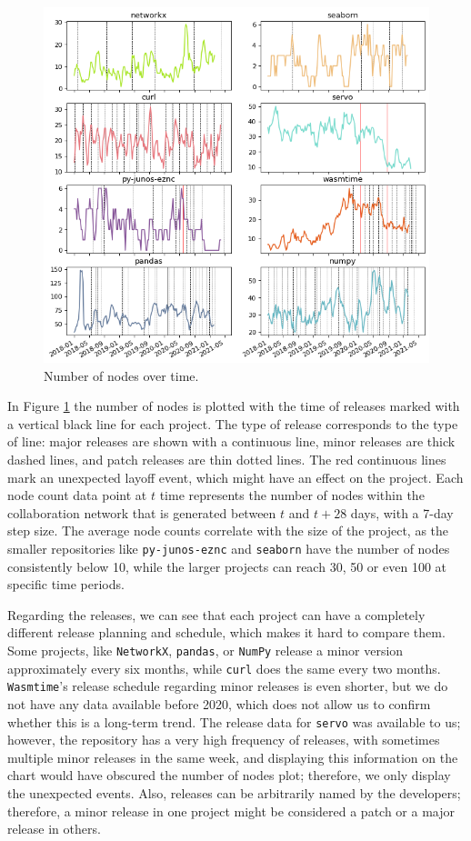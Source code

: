 \begin{figure}
    \centering
    \includegraphics[width=\textwidth]{figures/qualitative/number_of_nodes/all_v2.png}
    \caption{Number of nodes over time.}
    \label{fig:nnodes}
\end{figure}

In Figure \ref{fig:nnodes} the number of nodes is plotted with the time of releases marked with a vertical black line for each project. The type of release corresponds to the type of line: major releases are shown with a continuous line, minor releases are thick dashed lines, and patch releases are thin dotted lines. The red continuous lines mark an unexpected layoff event, which might have an effect on the project. Each node count data point at $t$ time represents the number of nodes within the collaboration network that is generated between $t$ and $t+28$ days, with a 7-day step size. The average node counts correlate with the size of the project, as the smaller repositories like \texttt{py-junos-eznc} and \texttt{seaborn} have the number of nodes consistently below 10, while the larger projects can reach 30, 50 or even 100 at specific time periods.

Regarding the releases, we can see that each project can have a completely different release planning and schedule, which makes it hard to compare them. Some projects, like \texttt{NetworkX}, \texttt{pandas}, or \texttt{NumPy} release a minor version approximately every six months, while \texttt{curl} does the same every two months. \texttt{Wasmtime}'s release schedule regarding minor releases is even shorter, but we do not have any data available before 2020, which does not allow us to confirm whether this is a long-term trend. The release data for \texttt{servo} was available to us; however, the repository has a very high frequency of releases, with sometimes multiple minor releases in the same week, and displaying this information on the chart would have obscured the number of nodes plot; therefore, we only display the unexpected events. Also, releases can be arbitrarily named by the developers; therefore, a minor release in one project might be considered a patch or a major release in others.

